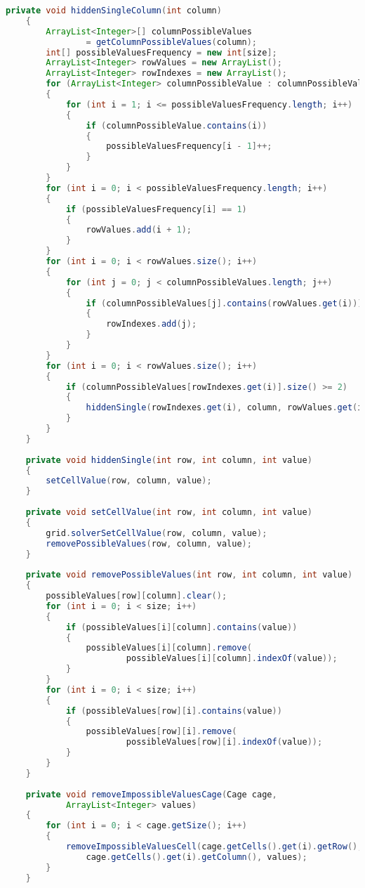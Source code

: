 \begin{lstlisting}[language=Java,basicstyle=\tiny,caption=SolverRuleBased.java]
    private void hiddenSingleColumn(int column)
    {
        ArrayList<Integer>[] columnPossibleValues 
                = getColumnPossibleValues(column);
        int[] possibleValuesFrequency = new int[size];
        ArrayList<Integer> rowValues = new ArrayList();
        ArrayList<Integer> rowIndexes = new ArrayList();
        for (ArrayList<Integer> columnPossibleValue : columnPossibleValues)
        {
            for (int i = 1; i <= possibleValuesFrequency.length; i++)
            {
                if (columnPossibleValue.contains(i))
                {
                    possibleValuesFrequency[i - 1]++;
                }
            }
        }
        for (int i = 0; i < possibleValuesFrequency.length; i++)
        {
            if (possibleValuesFrequency[i] == 1)
            {
                rowValues.add(i + 1);
            }
        }
        for (int i = 0; i < rowValues.size(); i++)
        {
            for (int j = 0; j < columnPossibleValues.length; j++)
            {
                if (columnPossibleValues[j].contains(rowValues.get(i)))
                {
                    rowIndexes.add(j);
                }
            }
        }
        for (int i = 0; i < rowValues.size(); i++)
        {
            if (columnPossibleValues[rowIndexes.get(i)].size() >= 2)
            {
                hiddenSingle(rowIndexes.get(i), column, rowValues.get(i));
            }
        }
    }
    
    private void hiddenSingle(int row, int column, int value)
    {
        setCellValue(row, column, value);
    }
    
    private void setCellValue(int row, int column, int value)
    {
        grid.solverSetCellValue(row, column, value);
        removePossibleValues(row, column, value);
    }
    
    private void removePossibleValues(int row, int column, int value)
    {
        possibleValues[row][column].clear();
        for (int i = 0; i < size; i++)
        {
            if (possibleValues[i][column].contains(value))
            {
                possibleValues[i][column].remove(
                        possibleValues[i][column].indexOf(value));
            }
        }
        for (int i = 0; i < size; i++)
        {
            if (possibleValues[row][i].contains(value))
            {
                possibleValues[row][i].remove(
                        possibleValues[row][i].indexOf(value));
            }
        }
    }
    
    private void removeImpossibleValuesCage(Cage cage, 
            ArrayList<Integer> values)
    {
        for (int i = 0; i < cage.getSize(); i++)
        {
            removeImpossibleValuesCell(cage.getCells().get(i).getRow(), 
                cage.getCells().get(i).getColumn(), values);
        }
    }
    

\end{lstlisting}
